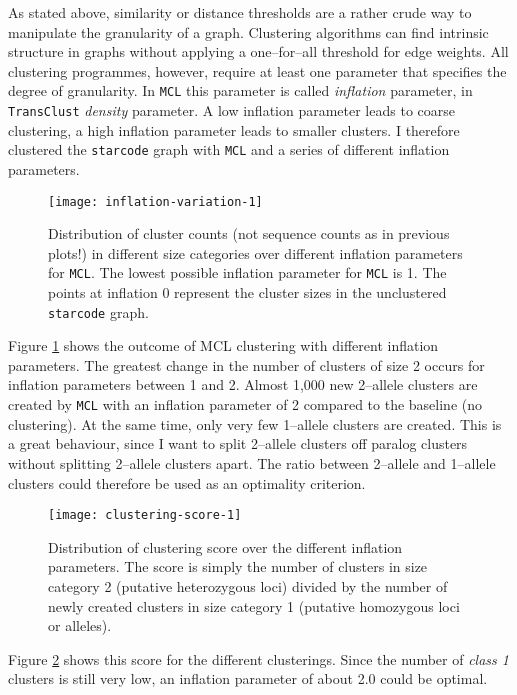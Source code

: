 \documentclass{article}\usepackage[]{graphicx}\usepackage[]{color}
\begin{document}
As stated above, similarity or distance thresholds are a rather crude way to manipulate the granularity of a graph. Clustering algorithms can find intrinsic structure in graphs without applying a one--for--all threshold for edge weights. All clustering programmes, however, require  at least one parameter that specifies the degree of granularity. In \texttt{MCL} this parameter is called \emph{inflation} parameter, in \texttt{TransClust} \emph{density} parameter. A low inflation parameter leads to coarse clustering, a high inflation parameter leads to smaller clusters. I therefore clustered the \texttt{starcode} graph with \texttt{MCL} and a series of different inflation parameters.  
\begin{figure}
\centering
\texttt{[image: inflation-variation-1]}
\caption{Distribution of cluster counts (not sequence counts as in previous plots!) in different size categories over different inflation parameters for \texttt{MCL}. The lowest possible inflation parameter for \texttt{MCL} is 1. The points at inflation 0 represent the cluster sizes in the unclustered \texttt{starcode} graph.}
\label{Fig:inflation-variation-1}
\end{figure}
Figure \ref{Fig:inflation-variation-1} shows the outcome of MCL clustering with different inflation parameters. The greatest change in the number of clusters of size 2 occurs for inflation parameters between 1 and 2. Almost 1,000 new 2--allele clusters are created by \texttt{MCL} with an inflation parameter of 2 compared to the baseline (no clustering). At the same time, only very few 1--allele clusters are created. This is a great behaviour, since I want to split 2--allele clusters off paralog clusters without splitting 2--allele clusters apart.
The ratio between 2--allele and 1--allele clusters could therefore be used as an optimality criterion. 
\begin{figure}
\centering
\texttt{[image: clustering-score-1]}
\caption{Distribution of clustering score over the different inflation parameters. The score is simply the number of clusters in size category 2 (putative heterozygous loci) divided by the number of newly created clusters in size category 1 (putative homozygous loci or alleles).}
\label{Fig:clustering-score-1}
\end{figure}
Figure \ref{Fig:clustering-score-1} shows this score for the different clusterings. Since the number of \emph{class 1} clusters is still very low, an inflation parameter of about 2.0 could be optimal.
\end{document}
